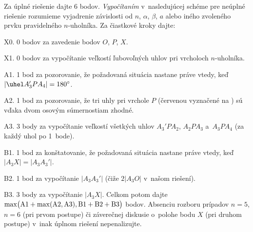 {\schemaABC
Za úplné riešenie dajte 6 bodov. \emph{Vypočítaním} v~nasledujúcej
schéme pre neúplné riešenie rozumieme vyjadrenie závislosti
od $n$, $\alpha$, $\beta$, $a$ alebo iného zvoleného prvku
pravidelného $n$-uholníka.
Za čiastkové kroky dajte:
\item{X0.} 0 bodov za zavedenie bodov $O$, $P$, $X$.
\item{X1.} 0 bodov za vypočítanie veľkostí ľubovoľných uhlov pri vrcholoch $n$-uholníka.
\item{A1.} 1 bod za pozorovanie, že požadovaná situácia nastane práve vtedy, keď $|\uhel A_3'PA_4|=180^{\circ}$.
\item{A2.} 1 bod za pozorovanie, že tri uhly pri vrchole $P$ (červenou vyznačené na ) sú vďaka dvom osovým súmernostiam zhodné.
\item{A3.} 3 body za vypočítanie veľkostí všetkých uhlov $A_3'PA_2$, $A_2PA_3$ a~$A_3PA_4$ (za každý uhol po 1~bode).
\item{B1.} 1 bod za konštatovanie, že požadovaná situácia nastane práve vtedy, keď $|A_3X|=|A_3A_3'|$.
\item{B2.} 1 bod za vypočítanie $|A_3A_3'|$ (čiže $2|A_3O|$ v~našom riešení).
\item{B3.} 3 body za vypočítanie $|A_3X|$.
\endgraf\noindent
Celkom potom dajte
$\rm\max\bigl({A1}+\max({A2},{A3}),
{B1}+{B2}+{B3}\bigr)$ bodov.
Absenciu rozboru prípadov $n=5$, $n=6$ (pri prvom postupe)
či záverečnej diskusie o~polohe bodu $X$ (pri druhom postupe)
v~inak úplnom riešení nepenalizujte.
\endschema

}


